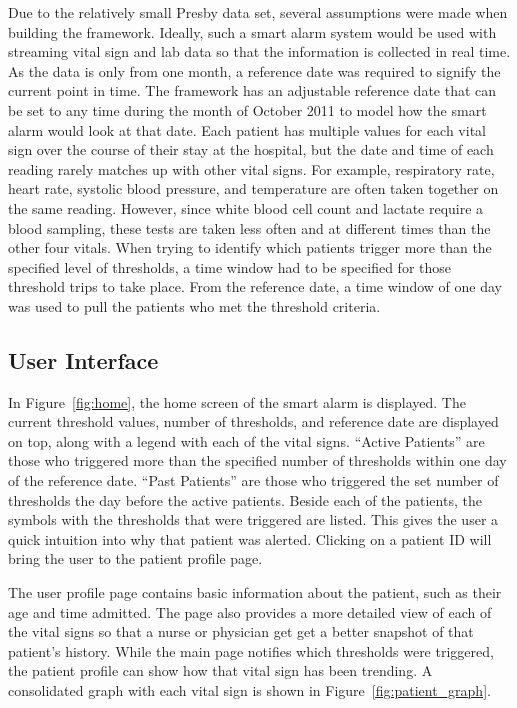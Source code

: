 \documentclass{sig-alternate}
\begin{document}
Due to the relatively small Presby data set, several assumptions were made when building the framework.  Ideally, such a smart alarm system would be used with streaming vital sign and lab data so that the information is collected in real time.  As the data is only from one month, a reference date was required to signify the current point in time.  The framework has an adjustable reference date that can be set to any time during the month of October 2011 to model how the smart alarm would look at that date.  Each patient has multiple values for each vital sign over the course of their stay at the hospital, but the date and time of each reading rarely matches up with other vital signs.  For example, respiratory rate, heart rate, systolic blood pressure, and temperature are often taken together on the same reading.  However, since white blood cell count and lactate require a blood sampling, these tests are taken less often and at different times than the other four vitals.  When trying to identify which patients trigger more than the specified level of thresholds, a time window had to be specified for those threshold trips to take place.  From the reference date, a time window of one day was used to pull the patients who met the threshold criteria.  

\vspace{10pt}
\subsection{User Interface}
\label{subsec:ui}
\vspace{10pt}

In Figure~\ref{fig:home}, the home screen of the smart alarm is displayed.  The current threshold values, number of thresholds, and reference date are displayed on top, along with a legend with each of the vital signs.  ``Active Patients'' are those who triggered more than the specified number of thresholds within one day of the reference date. ``Past Patients'' are those who triggered the set number of thresholds the day before the active patients.  Beside each of the patients, the symbols with the thresholds that were triggered are listed.  This gives the user a quick intuition into why that patient was alerted.  Clicking on a patient ID will bring the user to the patient profile page.

The user profile page contains basic information about the patient, such as their age and time admitted.  The page also provides a more detailed view of each of the vital signs so that a nurse or physician get get a better snapshot of that patient's history.  While the main page notifies which thresholds were triggered, the patient profile can show how that vital sign has been trending. A consolidated graph with each vital sign is shown in Figure~\ref{fig:patient_graph}.
\end{document}
